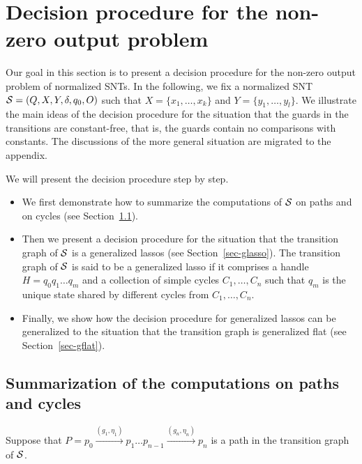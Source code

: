 
\section{Decision procedure for the non-zero output problem}\label{sec-dec-snt}

Our goal in this section is to present a decision procedure for the non-zero output problem of normalized SNTs.  In the following, we fix a normalized SNT ${\mathcal{S} } = (Q,X,Y,\delta,q_0,O)$ such that $X=\{ x_1,\dots, x_k\}$ and $Y = \{y_1,\dots,y_l\}$. We illustrate the main ideas of the decision procedure for the situation that the guards in the transitions are constant-free, that is, the guards contain no comparisons with constants. The discussions of the more general situation are migrated to the appendix. 

We will present the decision procedure step by step.
\begin{itemize}
\item We first demonstrate how to summarize the computations of ${\mathcal{S} }$ on paths and on cycles (see Section~\ref{sec-sum}). 
%
\item Then we present a decision procedure for the situation that the transition graph of ${\mathcal{S} }$ is a generalized lassos (see Section~\ref{sec-glasso}). The transition graph of ${\mathcal{S} }$ is said to be a generalized lasso if it comprises a handle $H=q_0 q_1 \dots q_m$ and a collection of simple cycles $C_1,\dots,C_n$ such that $q_m$ is the unique state shared by different cycles from $C_1,\dots,C_n$. 
%
\item Finally, we show how the decision procedure for generalized lassos can be generalized to the situation that the transition graph is generalized flat (see Section~\ref{sec-gflat}).
\end{itemize}




\subsection{Summarization of the computations on paths and cycles}\label{sec-sum}

Suppose that $P=p_0 \xrightarrow{(g_1,\eta_1)} p_1 \dots p_{n-1} \xrightarrow{(g_n,\eta_n)} p_{n}$ is a path in the transition graph of ${\mathcal{S} }$. 



